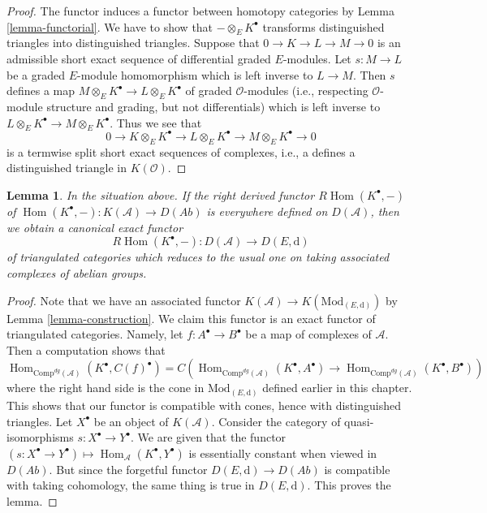 \documentclass{stacks-project}
\theoremstyle{plain}
\newtheorem{lemma}[subsection]{Lemma}
\theoremstyle{definition}
\theoremstyle{remark}
\numberwithin{equation}{subsection}
\def\Hom{\mathop{\mathrm{Hom}}\nolimits}
\begin{document}
\begin{proof}
The functor induces a functor between homotopy categories by
Lemma \ref{lemma-functorial}.
We have to show that $- \otimes_E K^\bullet$ transforms distinguished
triangles into distinguished triangles.
Suppose that $0 \to K \to L \to M \to 0$ is an admissible short
exact sequence of differential graded $E$-modules. Let $s : M \to L$ be
a graded $E$-module homomorphism which is left inverse to $L \to M$.
Then $s$ defines a map $M \otimes_E K^\bullet \to L \otimes_E K^\bullet$
of graded $\mathcal{O}$-modules (i.e., respecting $\mathcal{O}$-module
structure and grading, but not differentials)
which is left inverse to $L \otimes_E K^\bullet \to M \otimes_E K^\bullet$.
Thus we see that
$$
0 \to K \otimes_E K^\bullet \to L \otimes_E K^\bullet \to
M \otimes_E K^\bullet \to 0
$$
is a termwise split short exact sequences of complexes, i.e., a
defines a distinguished triangle in $K(\mathcal{O})$.
\end{proof}

\begin{lemma}
\label{lemma-existence-of-derived}
In the situation above. If the right derived functor $R\Hom(K^\bullet, -)$
of $\Hom(K^\bullet, -) : K(\mathcal{A}) \to D(\textit{Ab})$
is everywhere defined on $D(\mathcal{A})$, then we obtain a canonical exact
functor
$$
R\Hom(K^\bullet, -) : D(\mathcal{A}) \longrightarrow D(E, \text{d})
$$
of triangulated categories which reduces to the usual one  on taking
associated complexes of abelian groups.
\end{lemma}

\begin{proof}
Note that we have an associated functor
$K(\mathcal{A}) \to K(\text{Mod}_{(E, \text{d})})$ by
Lemma \ref{lemma-construction}.
We claim this functor is an exact functor of triangulated categories.
Namely, let $f : A^\bullet \to B^\bullet$ be a map of complexes
of $\mathcal{A}$. Then a computation shows that
$$
\Hom_{\text{Comp}^{dg}(\mathcal{A})}(K^\bullet, C(f)^\bullet)
=
C\left(
\Hom_{\text{Comp}^{dg}(\mathcal{A})}(K^\bullet, A^\bullet) \to
\Hom_{\text{Comp}^{dg}(\mathcal{A})}(K^\bullet, B^\bullet)
\right)
$$
where the right hand side is the cone in $\text{Mod}_{(E, \text{d})}$
defined earlier in this chapter.
This shows that our functor is compatible with cones, hence with
distinguished triangles. Let $X^\bullet$ be an object of $K(\mathcal{A})$.
Consider the category of quasi-isomorphisms $s : X^\bullet \to Y^\bullet$.
We are given that the functor
$(s : X^\bullet \to Y^\bullet) \mapsto \Hom_\mathcal{A}(K^\bullet, Y^\bullet)$
is essentially constant when viewed in $D(\textit{Ab})$.
But since the forgetful functor $D(E, \text{d}) \to D(\textit{Ab})$
is compatible with taking cohomology, the same thing is true in
$D(E, \text{d})$. This proves the lemma.
\end{proof}
\end{document}
